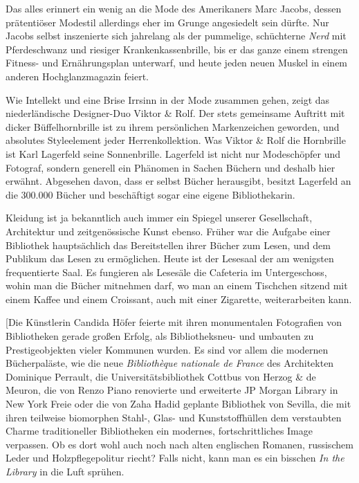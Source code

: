 \documentclass[output=paper]{langscibook}
\begin{document}
Das alles erinnert ein wenig an die Mode des Amerikaners Marc Jacobs,
dessen prätentiöser Modestil allerdings eher im Grunge angesiedelt sein
dürfte. Nur Jacobs selbst inszenierte sich jahrelang als der pummelige,
schüchterne \emph{Nerd} mit Pferdeschwanz und riesiger
Krankenkassenbrille, bis er das ganze einem strengen Fitness- und
Ernährungsplan unterwarf, und heute jeden neuen Muskel in einem anderen
Hochglanzmagazin feiert.

Wie Intellekt und eine Brise Irrsinn in der Mode zusammen gehen, zeigt
das niederländische Designer-Duo Viktor \& Rolf. Der stets gemeinsame
Auftritt mit dicker Büffelhornbrille ist zu ihrem persönlichen
Markenzeichen geworden, und absolutes Styleelement jeder
Herrenkollektion. Was Viktor \& Rolf die Hornbrille ist Karl Lagerfeld
seine Sonnenbrille. Lagerfeld ist nicht nur Modeschöpfer und Fotograf,
sondern generell ein Phänomen in Sachen Büchern und deshalb hier
erwähnt. Abgesehen davon, dass er selbst Bücher herausgibt, besitzt
Lagerfeld an die 300.000 Bücher und beschäftigt sogar eine eigene
Bibliothekarin.

Kleidung ist ja bekanntlich auch immer ein Spiegel unserer Gesellschaft,
Architektur und zeitgenössische Kunst ebenso. Früher war die Aufgabe
einer Bibliothek hauptsächlich das Bereitstellen ihrer Bücher zum Lesen,
und dem Publikum das Lesen zu ermöglichen. Heute ist der Lesesaal der am
wenigsten frequentierte Saal. Es fungieren als Lesesäle die Cafeteria im
Untergeschoss, wohin man die Bücher mitnehmen darf, wo man an einem
Tischchen sitzend mit einem Kaffee und einem Croissant, auch mit einer
Zigarette, weiterarbeiten kann.

{[}Die Künstlerin Candida Höfer feierte mit ihren monumentalen
Fotografien von Bibliotheken gerade großen Erfolg, als Bibliotheksneu-
und umbauten zu Prestigeobjekten vieler Kommunen wurden. Es sind vor
allem die modernen Bücherpaläste, wie die neue \emph{Bibliothèque
nationale de France} des Architekten Dominique Perrault, die
Universitätsbibliothek Cottbus von Herzog \& de Meuron, die von Renzo
Piano renovierte und erweiterte JP Morgan Library in New York Freie oder
die von Zaha Hadid geplante Bibliothek von Sevilla, die mit ihren
teilweise biomorphen Stahl-, Glas- und Kunststoffhüllen dem verstaubten
Charme traditioneller Bibliotheken ein modernes, fortschrittliches Image
verpassen. Ob es dort wohl auch noch nach alten englischen Romanen,
russischem Leder und Holzpflegepolitur riecht? Falls nicht, kann man es
ein bisschen \emph{In the Library} in die Luft sprühen.

\end{document}
